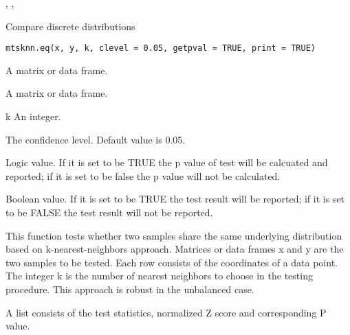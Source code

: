 \documentclass[a4paper]{book}
\begin{document}
%
\begin{SeeAlso}\relax
{}, , 
\end{SeeAlso}
%
\begin{Description}\relax
Compare discrete distributions
\end{Description}
%
\begin{Usage}
\begin{verbatim}
mtsknn.eq(x, y, k, clevel = 0.05, getpval = TRUE, print = TRUE)
\end{verbatim}
\end{Usage}
%
\begin{Arguments}
\begin{ldescription}
\item[\code{x}] A matrix or data frame.

\item[\code{y}] A matrix or data frame.

\item[\code{k}] k An integer.

\item[\code{clevel}] The confidence level. Default value is 0.05.

\item[\code{getpval}] Logic value. If it is set to be TRUE the p value of 
test will be calcuated and reported; if it is set to be false the 
p value will not be calculated.

\item[\code{print}] Boolean value. If it is set to be TRUE the test 
result will be reported; if it is set to be FALSE the test 
result will not be reported.
\end{ldescription}
\end{Arguments}
%
\begin{Details}\relax
This function tests whether two samples share the same underlying 
distribution based on k-nearest-neighbors approach.
Matrices or data frames x and y are the two samples to be tested. 
Each row consists of the coordinates of a data point. 
The integer k is the number of nearest neighbors to choose in the 
testing procedure. This approach is robust in the unbalanced case.
\end{Details}
%
\begin{Value}
A list consists of the test statistics, 
normalized Z score and corresponding P value.
\end{Value}
\end{document}
